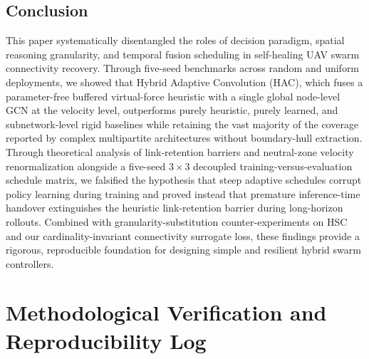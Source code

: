 \documentclass[11pt]{article}
\theoremstyle{plain}
\theoremstyle{definition}
\theoremstyle{remark}
\begin{document}
\subsection{Conclusion}
This paper systematically disentangled the roles of decision paradigm, spatial reasoning granularity, and temporal fusion scheduling in self-healing UAV swarm connectivity recovery. Through five-seed benchmarks across random and uniform deployments, we showed that Hybrid Adaptive Convolution (HAC), which fuses a parameter-free buffered virtual-force heuristic with a single global node-level GCN at the velocity level, outperforms purely heuristic, purely learned, and subnetwork-level rigid baselines while retaining the vast majority of the coverage reported by complex multipartite architectures without boundary-hull extraction. Through theoretical analysis of link-retention barriers and neutral-zone velocity renormalization alongside a five-seed $3 \times 3$ decoupled training-versus-evaluation schedule matrix, we falsified the hypothesis that steep adaptive schedules corrupt policy learning during training and proved instead that premature inference-time handover extinguishes the heuristic link-retention barrier during long-horizon rollouts. Combined with granularity-substitution counter-experiments on HSC and our cardinality-invariant connectivity surrogate loss, these findings provide a rigorous, reproducible foundation for designing simple and resilient hybrid swarm controllers.




\appendix

\section{Methodological Verification and Reproducibility Log}
\label{app:deviations}
\end{document}

